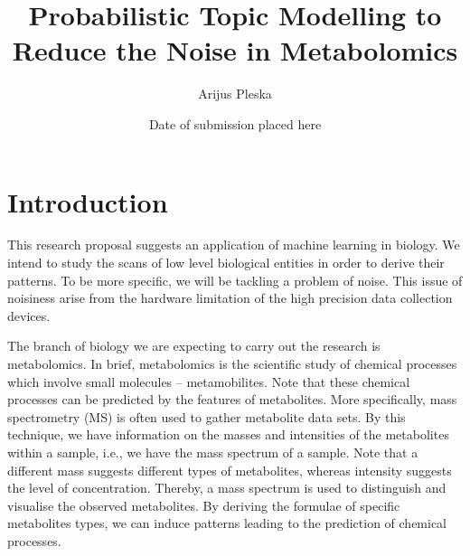 \documentclass{mprop}
\begin{document}
\title{Probabilistic Topic Modelling to Reduce the Noise in Metabolomics}
\author{Arijus Pleska}
\date{Date of submission placed here}
\maketitle

\tableofcontents
\newpage


\section{Introduction}

\par This research proposal suggests an application of machine learning in biology. We intend to study the scans of low level biological entities in order to derive their patterns. To be more specific, we will be tackling a problem of noise. This issue of noisiness arise from the hardware limitation of the high precision data collection devices.   

\par The branch of biology we are expecting to carry out the research is metabolomics. In brief, metabolomics is the scientific study of chemical processes which involve small molecules -- metamobilites. Note that these chemical processes can be predicted by the features of metabolites. More specifically, mass spectrometry (MS) is often used to gather metabolite data sets. By this technique, we have information on the masses and intensities of the metabolites within a sample, i.e., we have the mass spectrum of a sample. Note that a different mass suggests different types of metabolites, whereas intensity suggests the level of concentration. Thereby, a mass spectrum is used to distinguish and visualise the observed metabolites. By deriving the formulae of specific metabolites types, we can induce patterns leading to the prediction of chemical processes. 
\end{document}
